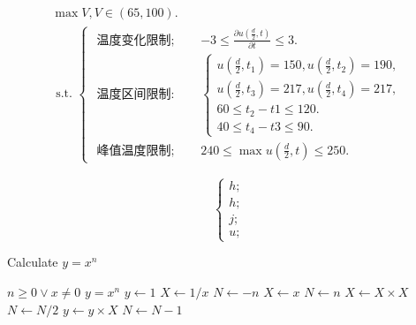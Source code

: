 \documentclass[fontset=windows]{whutmod}
\begin{document}
\begin{equation}
	\begin{gathered}
		\max V, V \in(65,100) . \\
		\text { s.t. } \begin{cases}\text { 温度变化限制; } \quad & -3 \leq \frac{\partial u\left(\frac{d}{2}, t\right)}{\partial t} \leq 3 . \\
			\text { 温度区间限制: } & \left\{\begin{array}{l}
				u\left(\frac{d}{2}, t_{1}\right)=150, u\left(\frac{d}{2}, t_{2}\right)=190, \\
				u\left(\frac{d}{2}, t_{3}\right)=217, u\left(\frac{d}{2}, t_{4}\right)=217, \\
				60 \leq t_{2}-t 1 \leq 120 . \\
				40 \leq t_{4}-t 3 \leq 90 .
			\end{array}\right. \\
			\text { 峰值温度限制; } \quad &240 \leq \max u\left(\frac{d}{2}, t\right) \leq 250 .\end{cases}
	\end{gathered}
\end{equation}

\begin{equation}
	\left\{ \begin{array}{l}
		h;\\
		h;\\
		j;\\
		u;
	\end{array} \right.
\end{equation}

\begin{algorithm} 
	\caption{Calculate $y = x^n$} 
	\label{alg3} 
	\begin{algorithmic}
		\REQUIRE $n \geq 0 \vee x \neq 0$ 
		\ENSURE $y = x^n$ 
		\STATE $y \gets 1$ 
		\STATE $X \gets 1 / x$ 
		\STATE $N \gets -n$ 
		\ELSE 
		\STATE $X \gets x$ 
		\STATE $N \gets n$ 
		\ENDIF 
		\STATE $X \gets X \times X$ 
		\STATE $N \gets N / 2$ 
		\ELSE[$N$ is odd] \STATE $y \gets y \times X$ 
		\STATE $N \gets N - 1$ 
		\ENDIF 
		\ENDWHILE 
	\end{algorithmic} 
\end{algorithm}
\end{document}
